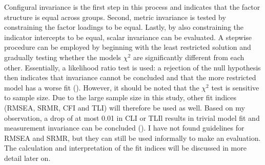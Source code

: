 \documentclass[11pt]{article}
\begin{document}
Configural invariance is the first step in this process and indicates that the
factor structure is equal across groups. Second, metric invariance is tested by
constraining the factor loadings to be equal. Lastly, by also
constraining the indicator intercepts to be equal, scalar invariance can be
evaluated. A stepwise procedure can be employed by beginning with the least
restricted solution and gradually testing whether the models $\chi^2$ are
significantly different from each other. Essentially, a likelihood ratio test is
used: a rejection of the null hypothesis then indicates that invariance cannot
be concluded and that the more restricted model has a worse fit
(\cite{brown2015}). However, it should be noted that the $\chi^2$ test is
sensitive to sample size. Due to the large sample size in this study, other fit
indices (RMSEA, SRMR, CFI and TLI) will therefore be used as well. Based on my
observation, a drop of at most 0.01 in CLI or TLIl results in trivial model fit
and measurement invariance can be concluded (\cite{chan2020}). I have not found
guidelines for RMSEA and SRMR, but they can still be used informally to make an
evaluation. The calculation and interpretation of the fit indices will be
discussed in more detail later on.

\begin{table}[h]
\captionsetup{singlelinecheck=off}
\caption{Sex measurement invariance}
\label{tab:sex_invariance}
\end{table}
\end{document}
